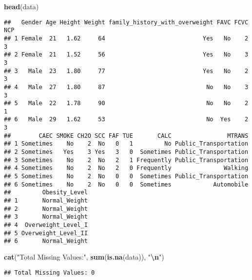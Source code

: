 \documentclass[
]{article}
\newenvironment{Shaded}{\begin{snugshade}}{\end{snugshade}}
\newcommand{\FunctionTok}[1]{\textcolor[rgb]{0.13,0.29,0.53}{\textbf{#1}}}
\newcommand{\NormalTok}[1]{#1}
\newcommand{\SpecialCharTok}[1]{\textcolor[rgb]{0.81,0.36,0.00}{\textbf{#1}}}
\newcommand{\StringTok}[1]{\textcolor[rgb]{0.31,0.60,0.02}{#1}}
\begin{document}
\begin{Shaded}
\begin{Highlighting}[]
\FunctionTok{head}\NormalTok{(data)}
\end{Highlighting}
\end{Shaded}

\begin{verbatim}
##   Gender Age Height Weight family_history_with_overweight FAVC FCVC NCP
## 1 Female  21   1.62     64                            Yes   No    2   3
## 2 Female  21   1.52     56                            Yes   No    3   3
## 3   Male  23   1.80     77                            Yes   No    2   3
## 4   Male  27   1.80     87                             No   No    3   3
## 5   Male  22   1.78     90                             No   No    2   1
## 6   Male  29   1.62     53                             No  Yes    2   3
##        CAEC SMOKE CH2O SCC FAF TUE       CALC                MTRANS
## 1 Sometimes    No    2  No   0   1         No Public_Transportation
## 2 Sometimes   Yes    3 Yes   3   0  Sometimes Public_Transportation
## 3 Sometimes    No    2  No   2   1 Frequently Public_Transportation
## 4 Sometimes    No    2  No   2   0 Frequently               Walking
## 5 Sometimes    No    2  No   0   0  Sometimes Public_Transportation
## 6 Sometimes    No    2  No   0   0  Sometimes            Automobile
##         Obesity_Level
## 1       Normal_Weight
## 2       Normal_Weight
## 3       Normal_Weight
## 4  Overweight_Level_I
## 5 Overweight_Level_II
## 6       Normal_Weight
\end{verbatim}

\begin{Shaded}
\begin{Highlighting}[]
\FunctionTok{cat}\NormalTok{(}\StringTok{"Total Missing Values:"}\NormalTok{, }\FunctionTok{sum}\NormalTok{(}\FunctionTok{is.na}\NormalTok{(data)), }\StringTok{"}\SpecialCharTok{\textbackslash{}n}\StringTok{"}\NormalTok{)}
\end{Highlighting}
\end{Shaded}

\begin{verbatim}
## Total Missing Values: 0
\end{verbatim}
\end{document}
